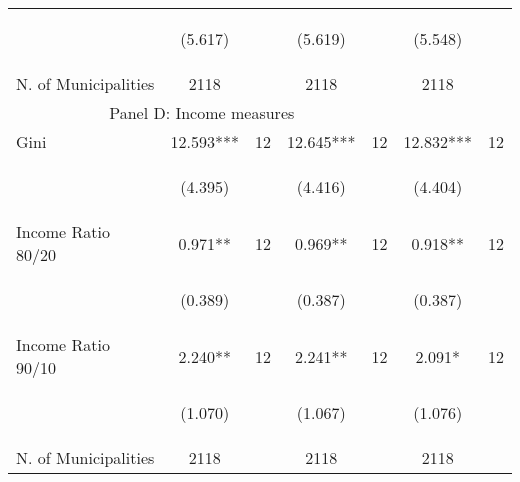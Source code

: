 \begin{tabular}{lcccccc}
\vspace{4pt} &  \begin{footnotesize}(5.617)\end{footnotesize}   & &
			    \begin{footnotesize}(5.619)\end{footnotesize}   & &
			    \begin{footnotesize}(5.548)\end{footnotesize}   &
			     \\

N. of Municipalities   &   2118   & &    2118 &    &  2118  &   \\
\hline	

\multicolumn{5}{c}{Panel D: Income measures} \\

Gini    &  12.593***   &  12  &   12.645***  &  12 &  12.832***  &  12   \\

\vspace{4pt} &  \begin{footnotesize}(4.395)\end{footnotesize}   & &
			    \begin{footnotesize}(4.416)\end{footnotesize}   & &
			    \begin{footnotesize}(4.404)\end{footnotesize}   &
			     \\          


Income Ratio 80/20     &  0.971**   &  12  &   0.969**  &  12 &  0.918**  &  12   \\

\vspace{4pt} &  \begin{footnotesize}(0.389)\end{footnotesize}   & &
			    \begin{footnotesize}(0.387)\end{footnotesize}   & &
			    \begin{footnotesize}(0.387)\end{footnotesize}   &
			     \\


Income Ratio 90/10     &  2.240**   &  12  &   2.241**  &  12 &  2.091*  &  12   \\

\vspace{4pt} &  \begin{footnotesize}(1.070)\end{footnotesize}   & &
			    \begin{footnotesize}(1.067)\end{footnotesize}   & &
			    \begin{footnotesize}(1.076)\end{footnotesize}   &
			     \\


N. of Municipalities   &   2118   & &    2118 &    &  2118  &   \\
\hline	


\end{tabular}%

